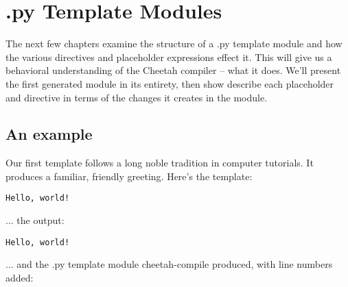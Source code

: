 \section{.py Template Modules}
\label{pyModules}

The next few chapters examine the structure of a .py template module and how 
the various directives and placeholder expressions effect it.  This will give
us a behavioral understanding of the Cheetah compiler -- what it does.  We'll
present the first generated module in its entirety, then show describe each
placeholder and directive in terms of the changes it creates in the module.

\subsection{An example}
\label{pyModules.example}

Our first template follows a long noble tradition in computer tutorials.
It produces a familiar, friendly greeting.  Here's the template:

\begin{verbatim}
Hello, world!
\end{verbatim}

... the output:

\begin{verbatim}
Hello, world!
\end{verbatim}

... and the .py template module cheetah-compile produced, with line
numbers added:


